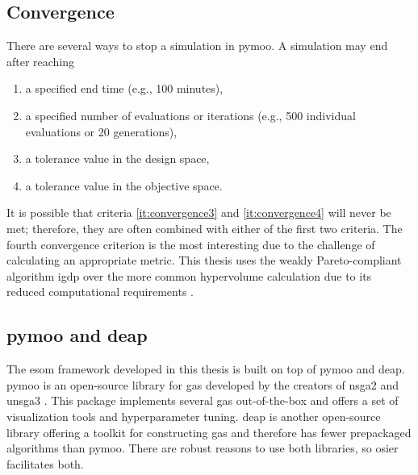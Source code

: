 \subsection{Convergence}
There are several ways to stop a simulation in \ac{pymoo}. A simulation may end after reaching
\begin{enumerate}
    \item a specified end time (e.g., 100 minutes),
    \label{it:convergence1}
    \item a specified number of evaluations or iterations (e.g., 500 individual evaluations or 20 generations),
    \label{it:convergence2}
    \item a tolerance value in the design space,
    \label{it:convergence3}    
    \item a tolerance value in the objective space.
    \label{it:convergence4}
\end{enumerate}

It is possible that criteria \ref{it:convergence3} and \ref{it:convergence4} will never be met; therefore, they are often
combined with either of the first two criteria. The fourth convergence criterion is the most interesting due to the challenge of calculating an appropriate metric. This thesis uses the weakly Pareto-compliant algorithm \ac{igdp} over the more common hypervolume 
calculation due to its reduced computational requirements \cite{ishibuchi_modified_2015}.

\subsection{\acs{pymoo} and \acs{deap}}

The \ac{esom} framework developed in this thesis is built on top of \ac{pymoo} and \ac{deap}. 
\ac{pymoo} is an open-source library for \acp{ga} developed by the creators of 
\ac{nsga2} and \ac{unsga3} \cite{blank_pymoo_2020}. This package implements several 
\acp{ga} out-of-the-box and offers a set of visualization tools and hyperparameter tuning. \ac{deap} is another open-source library offering a toolkit for constructing \acp{ga} and therefore has fewer prepackaged algorithms than \ac{pymoo}. There are robust reasons to use
both libraries, so \ac{osier} facilitates both.




